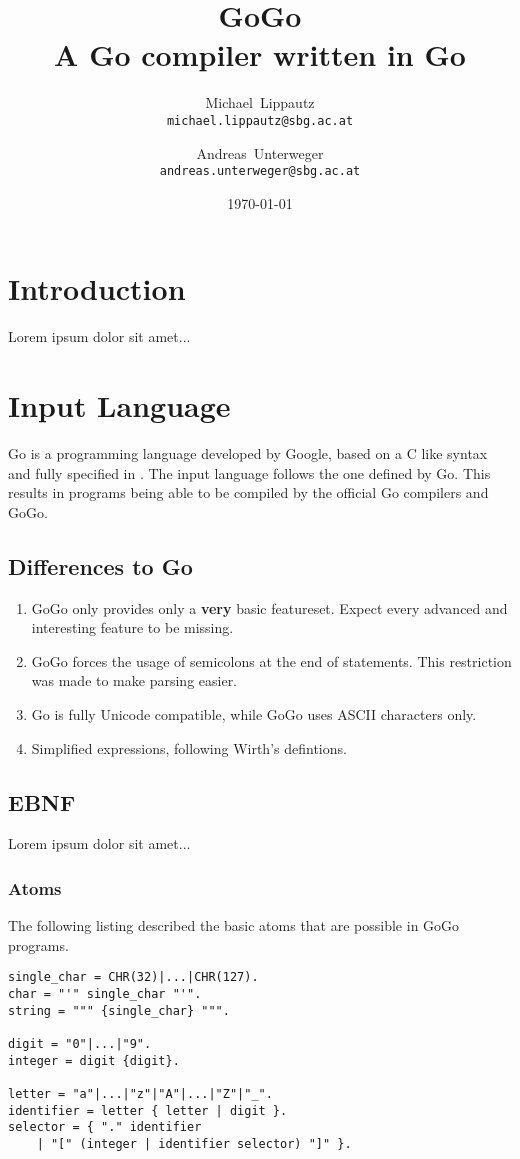 \documentclass[a4paper]{report}
\title{GoGo\\ \large{A Go compiler written in Go}}
\author{
  Michael~Lippautz \\ \normalsize{\texttt{michael.lippautz@sbg.ac.at}} 
    \and 
  Andreas~Unterweger \\ \normalsize{\texttt{andreas.unterweger@sbg.ac.at}} 
}
\date{\today}
\begin{document}
  \maketitle
  \tableofcontents

  \chapter{Introduction}
    Lorem ipsum dolor sit amet...

  \chapter{Input Language}
    Go is a programming language developed by Google, based on a C like syntax and fully specified in \cite{var10}. The input language follows the one defined by Go. This results in programs being able to be compiled by the official Go compilers and GoGo.

    \section{Differences to Go}
      \begin{enumerate}
        \item GoGo only provides only a \textbf{very} basic featureset. Expect every advanced and interesting feature to be missing.
        \item GoGo forces the usage of semicolons at the end of statements. This restriction was made to make parsing easier.
        \item Go is fully Unicode compatible, while GoGo uses ASCII characters only.
        \item Simplified expressions, following Wirth's \cite{wir96} defintions.
      \end{enumerate}

    \section{EBNF}
      Lorem ipsum dolor sit amet...

      \subsection{Atoms}
        The following listing described the basic atoms that are possible in GoGo programs.

        \begin{lstlisting}[caption=Atoms]
single_char = CHR(32)|...|CHR(127).
char = "'" single_char "'".
string = """ {single_char} """.

digit = "0"|...|"9".	
integer = digit {digit}.

letter = "a"|...|"z"|"A"|...|"Z"|"_".
identifier = letter { letter | digit }.
selector = { "." identifier 
    | "[" (integer | identifier selector) "]" }.
        \end{lstlisting}
\end{document}
